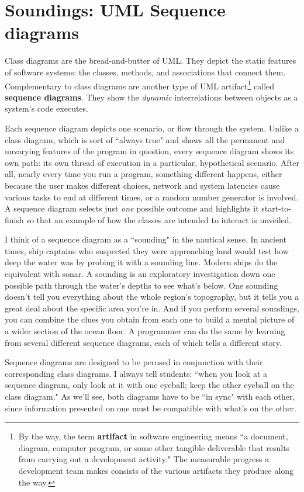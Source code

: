 
\chapter{Soundings: UML Sequence diagrams}

Class diagrams are the bread-and-butter of UML. They depict the static
features of software systems: the classes, methods, and associations that
connect them. Complementary to class diagrams are another type of UML
artifact\footnote{By the way, the term \textbf{artifact} in software
engineering means ``a document, diagram, computer program, or some other
tangible deliverable that results from carrying out a development activity."
The measurable progress a development team makes consists of the various
artifacts they produce along the way.} called \textbf{sequence diagrams}. They
show the \textit{dynamic} interrelations between objects as a system's code
executes.

Each sequence diagram depicts one scenario, or flow through the system. Unlike
a class diagram, which is sort of ``always true" and shows all the permanent
and unvarying features of the program in question, every sequence diagram
shows its own path: its own thread of execution in a particular, hypothetical
scenario. After all, nearly every time you run a program, something different
happens, either because the user makes different choices, network and system
latencies cause various tasks to end at different times, or a random number
generator is involved. A sequence diagram selects just \textit{one} possible
outcome and highlights it start-to-finish so that an example of how the
classes are intended to interact is unveiled.

I think of a sequence diagram as a ``sounding" in the nautical sense. In
ancient times, ship captains who suspected they were approaching land would
test how deep the water was by probing it with a sounding line. Modern ships
do the equivalent with sonar. A sounding is an exploratory investigation down
one possible path through the water's depths to see what's below. One sounding
doesn't tell you everything about the whole region's topography, but it tells
you a great deal about the specific area you're in. And if you perform several
soundings, you can combine the clues you obtain from each one to build a
mental picture of a wider section of the ocean floor. A programmer can do the
same by learning from several different sequence diagrams, each of which
tells a different story.

Sequence diagrams are designed to be perused in conjunction with their
corresponding class diagrams. I always tell students: ``when you look at a
sequence diagram, only look at it with one eyeball; keep the other eyeball on
the class diagram." As we'll see, both diagrams have to be ``in sync" with
each other, since information presented on one must be compatible with what's
on the other.

